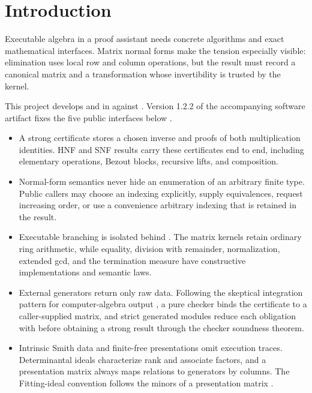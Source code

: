 \section{Introduction}
\label{sec:introduction}

Executable algebra in a proof assistant needs concrete algorithms and exact
mathematical interfaces. Matrix normal forms make the tension especially
visible: elimination uses local row and column operations, but the result must
record a canonical matrix and a transformation whose invertibility is trusted
by the kernel.

This project develops \HNF{} and \SNF{} in \Lean{} against \mathlib{}
\citep{deMouraUllrich2021Lean4,mathlib2020}. Version 1.2.2 of the accompanying
software artifact fixes the five public interfaces below
\citep{ji2026normalforms}.

\begin{itemize}
  \item A strong certificate stores a chosen inverse and proofs of both
    multiplication identities. HNF and SNF results carry these certificates
    end to end, including elementary operations, Bezout blocks, recursive
    lifts, and composition.
  \item Normal-form semantics never hide an enumeration of an arbitrary finite
    type. Public callers may choose an indexing explicitly, supply
    equivalences, request increasing order, or use a convenience arbitrary
    indexing that is retained in the result.
  \item Executable branching is isolated behind
    . The matrix kernels retain ordinary ring
    arithmetic, while equality, division with remainder, normalization,
    extended gcd, and the termination measure have constructive
    implementations and semantic laws.
  \item External generators return only raw data. Following the skeptical
    integration pattern for computer-algebra output
    \citep{harrisonThery1998}, a pure checker binds the
    certificate to a caller-supplied matrix, and strict generated modules reduce
    each obligation with  before obtaining a strong result
    through the checker soundness theorem.
  \item Intrinsic Smith data and finite-free presentations omit execution
    traces. Determinantal ideals characterize rank and associate factors, and a
    presentation matrix always maps relations to generators by columns. The
    Fitting-ideal convention follows the minors of a presentation matrix
    \citep{stacksFittingIdeals}.
\end{itemize}

